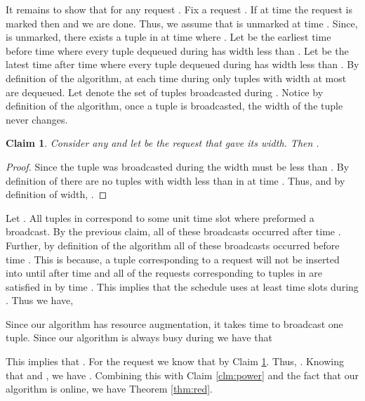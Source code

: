 \documentclass[11pt]{article}
\newtheorem{claim}[lemma]{Claim}
\begin{document}
It remains to show that  for any request . Fix a request .  If at time  the request  is marked then  and we are done. Thus, we assume that  is unmarked at time .  Since,  is unmarked, there exists a tuple  in  at time  where .  Let  be the earliest time before time  where every tuple  dequeued during  has width less than .  Let  be the latest time after time  where every tuple dequeued during  has width less than . By definition of the algorithm, at each time during  only tuples with width at most   are dequeued.  Let  denote the set of tuples broadcasted during .  Notice by definition of the algorithm,  once a tuple is broadcasted, the width of the tuple never changes.


\begin{claim}\label{clm1}
Consider any  and let  be the request that gave  its width.  Then .
\end{claim}
\begin{proof}
Since the tuple  was broadcasted during  the width  must be less than .   By definition of  there are no tuples with width less than  in  at time .  Thus,  and by definition of width, .
\end{proof}


Let .  All   tuples in  correspond to some unit time slot where  preformed a broadcast.  By the previous claim, all of these broadcasts occurred after time . Further,  by definition of the algorithm all of these broadcasts occurred before time .  This is because, a tuple corresponding to a request  will not be inserted into  until after time  and all of the requests corresponding to tuples in  are satisfied in  by time .  This implies that the schedule  uses at least  time slots during . Thus we have,  


Since our algorithm has  resource augmentation, it takes  time to broadcast one tuple.  Since our algorithm is always busy during  we have that 

 

 
This implies that .  For the request  we know that  by Claim \ref{clm1}. Thus, . Knowing that  and , we have .  Combining this with Claim \ref{clm:power} and the fact that our algorithm is online, we have Theorem \ref{thm:red}.
\end{document}
